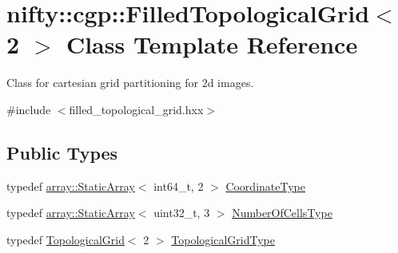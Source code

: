 \hypertarget{classnifty_1_1cgp_1_1FilledTopologicalGrid_3_012_01_4}{}\section{nifty\+:\+:cgp\+:\+:Filled\+Topological\+Grid$<$ 2 $>$ Class Template Reference}
\label{classnifty_1_1cgp_1_1FilledTopologicalGrid_3_012_01_4}


Class for cartesian grid partitioning for 2d images.  




{\ttfamily \#include $<$filled\+\_\+topological\+\_\+grid.\+hxx$>$}

\subsection*{Public Types}
\begin{DoxyCompactItemize}
\item 
typedef \hyperlink{namespacenifty_1_1array_a683f151f19c851754e0c6d55ed16a0c2}{array\+::\+Static\+Array}$<$ int64\+\_\+t, 2 $>$ \hyperlink{classnifty_1_1cgp_1_1FilledTopologicalGrid_3_012_01_4_a744d1529d7bb50ca95236a5abaded0ad}{Coordinate\+Type}
\item 
typedef \hyperlink{namespacenifty_1_1array_a683f151f19c851754e0c6d55ed16a0c2}{array\+::\+Static\+Array}$<$ uint32\+\_\+t, 3 $>$ \hyperlink{classnifty_1_1cgp_1_1FilledTopologicalGrid_3_012_01_4_a4026316cb9c7a8e6958cb32e6324ea7d}{Number\+Of\+Cells\+Type}
\item 
typedef \hyperlink{classnifty_1_1cgp_1_1TopologicalGrid}{Topological\+Grid}$<$ 2 $>$ \hyperlink{classnifty_1_1cgp_1_1FilledTopologicalGrid_3_012_01_4_a18ed401fbaca132c3a3bce16c8f448a9}{Topological\+Grid\+Type}
\end{DoxyCompactItemize}
